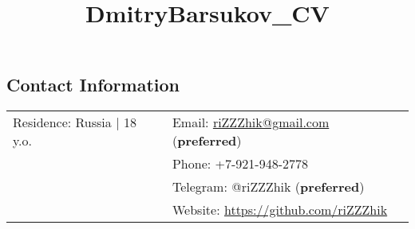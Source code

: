 \documentclass[margin,line]{res}
\begin{document}
\title{DmitryBarsukov_CV}

\begin{resume}

\section{\sc Contact Information}

\vspace{.05in}

\begin{tabular}{@{}p{2.30in}p{3in}}
Residence: Russia {|} 18 y.o.
& Email: \href{mailto:riZZZhik@gmail.com}{riZZZhik@gmail.com} (\textbf{preferred}) \\
& Phone: +7-921-948-2778 \\
& Telegram: @riZZZhik (\textbf{preferred}) \\
& Website: \href{https://github.com/riZZZhik}{https://github.com/riZZZhik} \\
\end{tabular}





\end{resume}
\end{document}

